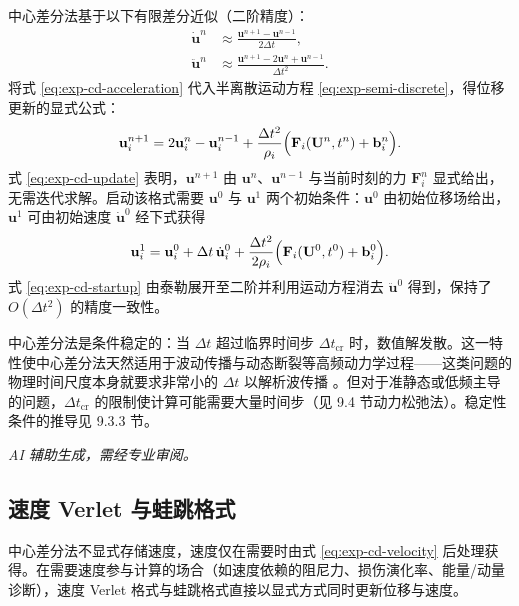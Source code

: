 中心差分法基于以下有限差分近似（二阶精度）：
\begin{align}
  \dot{\mathbf{u}}^{n}
  &\approx \frac{\mathbf{u}^{n+1}-\mathbf{u}^{n-1}}{2\Delta t},
  \label{eq:exp-cd-velocity} \\
  \ddot{\mathbf{u}}^{n}
  &\approx \frac{\mathbf{u}^{n+1}-2\mathbf{u}^{n}+\mathbf{u}^{n-1}}{\Delta t^{2}}.
  \label{eq:exp-cd-acceleration}
\end{align}
将式 \eqref{eq:exp-cd-acceleration} 代入半离散运动方程 \eqref{eq:exp-semi-discrete}，得位移更新的显式公式：
\begin{equation}
  \mathbf{u}_i^{n+1}
  =2\mathbf{u}_i^{n}-\mathbf{u}_i^{n-1}
  +\frac{\Delta t^{2}}{\rho_i}
  \Bigl(\mathbf{F}_i(\mathbf{U}^{n},t^{n})+\mathbf{b}_i^{n}\Bigr).
  \label{eq:exp-cd-update}
\end{equation}
式 \eqref{eq:exp-cd-update} 表明，$\mathbf{u}^{n+1}$ 由 $\mathbf{u}^{n}$、$\mathbf{u}^{n-1}$ 与当前时刻的力 $\mathbf{F}_i^{n}$ 显式给出，无需迭代求解。启动该格式需要 $\mathbf{u}^{0}$ 与 $\mathbf{u}^{1}$ 两个初始条件：$\mathbf{u}^{0}$ 由初始位移场给出，$\mathbf{u}^{1}$ 可由初始速度 $\dot{\mathbf{u}}^{0}$ 经下式获得
\begin{equation}
  \mathbf{u}_i^{1}
  =\mathbf{u}_i^{0}
  +\Delta t\,\dot{\mathbf{u}}_i^{0}
  +\frac{\Delta t^{2}}{2\rho_i}
  \Bigl(\mathbf{F}_i(\mathbf{U}^{0},t^{0})+\mathbf{b}_i^{0}\Bigr).
  \label{eq:exp-cd-startup}
\end{equation}
式 \eqref{eq:exp-cd-startup} 由泰勒展开至二阶并利用运动方程消去 $\ddot{\mathbf{u}}^{0}$ 得到，保持了 $O(\Delta t^{2})$ 的精度一致性。

\begin{remark}
  中心差分法是条件稳定的：当 $\Delta t$ 超过临界时间步 $\Delta t_{\text{cr}}$ 时，数值解发散。这一特性使中心差分法天然适用于波动传播与动态断裂等高频动力学过程——这类问题的物理时间尺度本身就要求非常小的 $\Delta t$ 以解析波传播 \cite{BelytschkoLiuMoran2000}。但对于准静态或低频主导的问题，$\Delta t_{\text{cr}}$ 的限制使计算可能需要大量时间步（见 9.4 节动力松弛法）。稳定性条件的推导见 9.3.3 节。
\end{remark}

\emph{AI 辅助生成，需经专业审阅。}

\subsection{速度 Verlet 与蛙跳格式}\label{sec:disc-verlet-leapfrog}

中心差分法不显式存储速度，速度仅在需要时由式 \eqref{eq:exp-cd-velocity} 后处理获得。在需要速度参与计算的场合（如速度依赖的阻尼力、损伤演化率、能量/动量诊断），速度 Verlet 格式与蛙跳格式直接以显式方式同时更新位移与速度。


